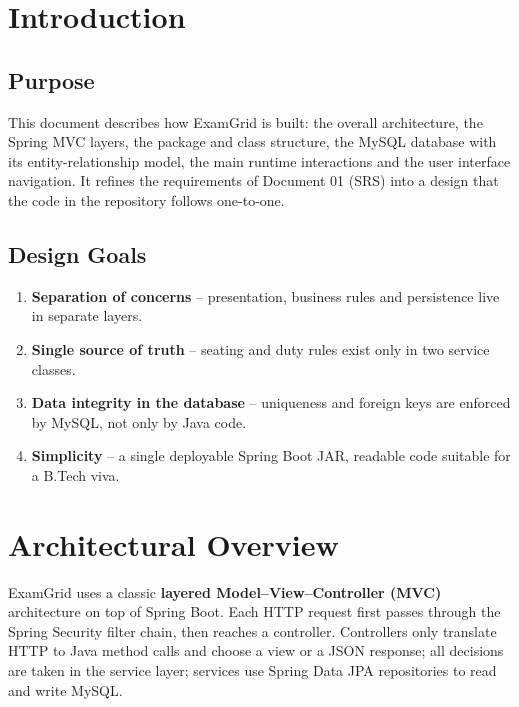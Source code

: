 \documentclass[11pt,a4paper]{article}
\begin{document}

\newpage
\tableofcontents
\listoffigures
\listoftables
\newpage
{}

\section{Introduction}
\subsection{Purpose}
This document describes how ExamGrid is built: the overall architecture, the Spring MVC layers, the package and class structure, the MySQL database with its entity-relationship model, the main runtime interactions and the user interface navigation. It refines the requirements of Document 01 (SRS) into a design that the code in the repository follows one-to-one.

\subsection{Design Goals}
\begin{enumerate}
  \item \textbf{Separation of concerns} -- presentation, business rules and persistence live in separate layers.
  \item \textbf{Single source of truth} -- seating and duty rules exist only in two service classes.
  \item \textbf{Data integrity in the database} -- uniqueness and foreign keys are enforced by MySQL, not only by Java code.
  \item \textbf{Simplicity} -- a single deployable Spring Boot JAR, readable code suitable for a B.Tech viva.
\end{enumerate}

\section{Architectural Overview}
ExamGrid uses a classic \textbf{layered Model--View--Controller (MVC)} architecture on top of Spring Boot. Each HTTP request first passes through the Spring Security filter chain, then reaches a controller. Controllers only translate HTTP to Java method calls and choose a view or a JSON response; all decisions are taken in the service layer; services use Spring Data JPA repositories to read and write MySQL.
\end{document}
